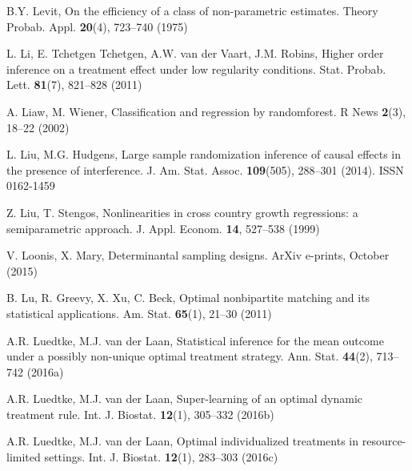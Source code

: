 \begin{list}{}{\setlength{\leftmargin}{2.1em}\setlength{\labelwidth}{0pt}
  \setlength{\labelsep}{0pt}\setlength{\itemindent}{-2.1em}
  \setlength{\parsep}{0pt}\setlength{\itemsep}{2pt}\setlength{\topsep}{0pt}}
\item\label{refentry:REF202}B.Y. Levit, On the efficiency of a class of non-parametric estimates. Theory Probab. Appl. \textbf{20}(4), 723--740 (1975)\label{refend:REF202}
\item\label{refentry:REF203}L. Li, E. Tchetgen Tchetgen, A.W. van der Vaart, J.M. Robins, Higher order inference on a treatment effect under low regularity conditions. Stat. Probab. Lett. \textbf{81}(7), 821--828 (2011)\label{refend:REF203}
\item\label{refentry:REF204}A. Liaw, M. Wiener, Classification and regression by randomforest. R News \textbf{2}(3), 18--22 (2002)\label{refend:REF204}
\item\label{refentry:REF205}L. Liu, M.G. Hudgens, Large sample randomization inference of causal effects in the presence of interference. J. Am. Stat. Assoc. \textbf{109}(505), 288--301 (2014). ISSN 0162-1459\label{refend:REF205}
\item\label{refentry:REF206}Z. Liu, T. Stengos, Nonlinearities in cross country growth regressions: a semiparametric approach. J. Appl. Econom. \textbf{14}, 527--538 (1999)\label{refend:REF206}
\item\label{refentry:REF207}V. Loonis, X. Mary, Determinantal sampling designs. ArXiv e-prints, October (2015)\label{refend:REF207}
\item\label{refentry:REF208}B. Lu, R. Greevy, X. Xu, C. Beck, Optimal nonbipartite matching and its statistical applications. Am. Stat. \textbf{65}(1), 21--30 (2011)\label{refend:REF208}
\item\label{refentry:REF209}A.R. Luedtke, M.J. van der Laan, Statistical inference for the mean outcome under a possibly non-unique optimal treatment strategy. Ann. Stat. \textbf{44}(2), 713--742 (2016a)\label{refend:REF209}
\item\label{refentry:REF210}A.R. Luedtke, M.J. van der Laan, Super-learning of an optimal dynamic treatment rule. Int. J. Biostat. \textbf{12}(1), 305--332 (2016b)\label{refend:REF210}
\item\label{refentry:REF211}A.R. Luedtke, M.J. van der Laan, Optimal individualized treatments in resource-limited settings. Int. J. Biostat. \textbf{12}(1), 283--303 (2016c)\label{refend:REF211}

\end{list}
